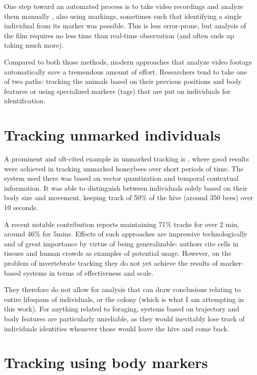 One step toward an automated process is to take video recordings and analyze
them manually \citep{naug_structure_2008}, also using markings, sometimes such
that identifying a single individual from its marker was possible. This is less
error-prone, but analysis of the film requires no less time than real-time
observation (and often ends up taking much more). 

Compared to both those methods, modern approaches that analyze video footage
automatically save a tremendous amount of effort. Researchers tend to take one
of two paths: tracking the animals based on their previous positions and body
features or using specialized markers (tags) that are put on individuals for
identification.

\section{Tracking unmarked individuals} 

A prominent and oft-cited example in unmarked tracking is
\citep{kimura_new_2011}, where good results were achieved in tracking unmarked
honeybees over short periods of time. The system used there was based on vector
quantization and temporal contextual information. It was able to distinguish
between individuals solely based on their body size and movement, keeping track
of 50\% of the hive (around 350 bees) over 10 seconds. 

A recent notable contribution \citep{bozek_pixel_2018} reports maintaining 71\% tracks
for over 2 min, around 46\% for 5mins. Effects of such approaches are impressive
technologically and of great importance by virtue of being generalizable: 
authors cite cells in tissues and human crowds as examples of potential usage.
However, on the problem of invertebrate tracking they do not yet achieve the results
of marker-based systems in terms of effectiveness and scale. 

They therefore do not allow for analysis that can draw conclusions relating to
entire lifespans of individuals, or the colony (which is what I am attempting in
this work). For anything related to foraging, systems based on trajectory and
body features are particularly unreliable, as they would inevitably lose track
of individuals\’ identities whenever those would leave the hive and come back.

\section{Tracking using body markers}

